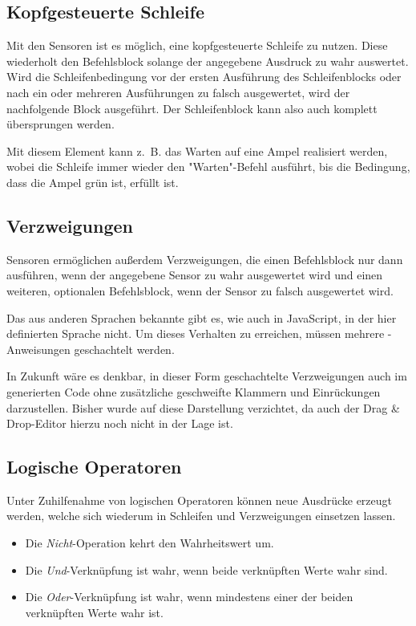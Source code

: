 \subsection*{Kopfgesteuerte Schleife}
\label{sec:implementation:elements:while}

Mit den Sensoren ist es möglich, eine kopfgesteuerte Schleife zu nutzen. Diese wiederholt den Befehlsblock solange der angegebene Ausdruck zu wahr auswertet. Wird die Schleifenbedingung vor der ersten Ausführung des Schleifenblocks oder nach ein oder mehreren Ausführungen zu falsch ausgewertet, wird der nachfolgende Block ausgeführt. Der Schleifenblock kann also auch komplett übersprungen werden.

Mit diesem Element kann z.~B. das Warten auf eine Ampel realisiert werden, wobei die Schleife immer wieder den "Warten"-Be\-fehl ausführt, bis die Bedingung, dass die Ampel grün ist, erfüllt ist.

\subsection*{Verzweigungen}
\label{sec:implementation:elements:if-else}

Sensoren ermöglichen außerdem Verzweigungen, die einen Befehlsblock nur dann ausführen, wenn der angegebene Sensor zu wahr ausgewertet wird und einen weiteren, optionalen Befehlsblock, wenn der Sensor zu falsch ausgewertet wird.

Das aus anderen Sprachen bekannte  gibt es, wie auch in JavaScript, in der hier definierten Sprache nicht. Um dieses Verhalten zu erreichen, müssen mehrere -An\-wei\-sungen geschachtelt werden.

In Zukunft wäre es denkbar, in dieser Form geschachtelte Verzweigungen auch im generierten Code ohne zusätzliche geschweifte Klammern und Einrückungen darzustellen. Bisher wurde auf diese Darstellung verzichtet, da auch der Drag \& Drop-Edi\-tor hierzu noch nicht in der Lage ist.

\subsection*{Logische Operatoren}
\label{sec:implementation:elements:op}

Unter Zuhilfenahme von logischen Operatoren können neue Ausdrücke erzeugt werden, welche sich wiederum in Schleifen und Verzweigungen einsetzen lassen.

\begin{itemize}[noitemsep]
  \item Die \emph{Nicht}-Operation kehrt den Wahrheitswert um.
  \item Die \emph{Und}-Verknüpfung ist wahr, wenn beide verknüpften Werte wahr sind.
  \item Die \emph{Oder}-Verknüpfung ist wahr, wenn mindestens einer der beiden verknüpften Werte wahr ist.
\end{itemize}

